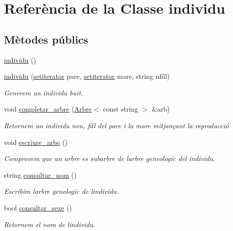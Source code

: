 \hypertarget{classindividu}{}\section{Referència de la Classe individu}
\label{classindividu}
\subsection*{Mètodes públics}
\begin{DoxyCompactItemize}
\item 
\hyperlink{classindividu_af1ba9dc86a04bff6b41ed2d1cf3202b9}{individu} ()
\item 
\hyperlink{classindividu_a6c431979119a07f4dc2be041d6cf73da}{individu} (\hyperlink{main_8cc_a54fb6ab8ec9e9336d208b860dca1513d}{setiterator} pare, \hyperlink{main_8cc_a54fb6ab8ec9e9336d208b860dca1513d}{setiterator} mare, string nfill)
\begin{DoxyCompactList}\small\item\em Generem un individu buit. \end{DoxyCompactList}\item 
void \hyperlink{classindividu_a26629996515393200f023f0f13141e6a}{completar\+\_\+arbre} (\hyperlink{class_arbre}{Arbre}$<$ const string $>$ \&arb)
\begin{DoxyCompactList}\small\item\em Retornem un individu nou, fill del pare i la mare mitjançant la reproducció \end{DoxyCompactList}\item 
void \hyperlink{classindividu_a3667eea520362bd57b5d0bce7510ecc2}{escriure\+\_\+arbe} ()
\begin{DoxyCompactList}\small\item\em Comprovem que un arbre es subarbre de l\textquotesingle{}arbre geneologic del individu. \end{DoxyCompactList}\item 
string \hyperlink{classindividu_a524053921304f914deac29c6baa80e15}{consultar\+\_\+nom} ()
\begin{DoxyCompactList}\small\item\em Escribim l\textquotesingle{}arbre genologic de l\textquotesingle{}individu. \end{DoxyCompactList}\item 
bool \hyperlink{classindividu_a30ab21dfd66b20a748bcf41e0b3108a0}{consultar\+\_\+sexe} ()
\begin{DoxyCompactList}\small\item\em Retornem el nom de l\textquotesingle{}individu. \end{DoxyCompactList}\item 

\end{DoxyCompactItemize}
